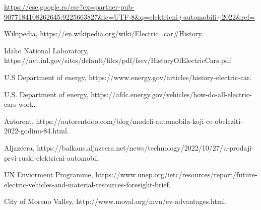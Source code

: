\documentclass[a4paper]{article}
\begin{document}
\newpage
{}
\appendix

\begin{thebibliography}{9}

 \url{https://cse.google.rs/cse?cx=partner-pub-9077184108262645:9225663827&ie=UTF-8&q=elektricni+automobili+2022&ref=}

Wikipedia,
https://en.wikipedia.org/wiki/Electric\_car#History.

Idaho National Laboratory,
https://avt.inl.gov/sites/default/files/pdf/fsev/HistoryOfElectricCars.pdf

U.S Department of energy,
https://www.energy.gov/articles/history-electric-car.

U.S. Department of energy,
https://afdc.energy.gov/vehicles/how-do-all-electric-cars-work.

Autorent,
https://autorentdoo.com/blog/modeli-automobila-koji-ce-obeleziti-2022-godinu-84.html.

Aljazeera,
https://balkans.aljazeera.net/news/technology/2022/10/27/u-prodaji-prvi-ruski-elektricni-automobil.

UN Enviorment Programme, https://www.unep.org/ietc/resources/report/future-electric-vehicles-and-material-resources-foresight-brief.

City of Moreno Valley,
http://www.moval.org/mvu/ev-advantages.html.

\end{thebibliography}
\end{document}
